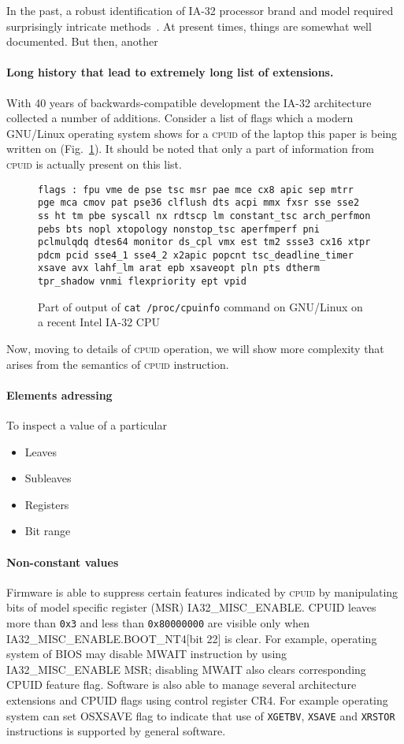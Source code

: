 \documentclass[a4paper,10pt,oneside,unicode]{article}
\newcommand{\cpuid}{\textsc{cpuid} }
\begin{document}
In the past, a robust identification of IA-32 processor brand and model required surprisingly intricate methods~\cite{cpuid-wars}. At present times, things are somewhat well documented. But then, another

\paragraph{Long history that lead to extremely long list of extensions.} With 40 years of backwards-compatible development the IA-32 architecture collected a number of additions. Consider a list of flags which a modern GNU/Linux operating system shows for a \cpuid of the laptop this paper is being written on (Fig.~\ref{fig:flags}). It should be noted that only a part of information from \cpuid is actually present on this list.

\begin{figure}
\noindent\texttt{flags           : fpu vme de pse tsc msr pae mce cx8 apic sep mtrr pge mca cmov pat pse36 clflush dts acpi mmx fxsr sse sse2 ss ht tm pbe syscall nx rdtscp lm constant\_tsc arch\_perfmon pebs bts nopl xtopology nonstop\_tsc aperfmperf pni pclmulqdq dtes64 monitor ds\_cpl vmx est tm2 ssse3 cx16 xtpr pdcm pcid sse4\_1 sse4\_2 x2apic popcnt tsc\_deadline\_timer xsave avx lahf\_lm arat epb xsaveopt pln pts dtherm tpr\_shadow vnmi flexpriority ept vpid
}
\caption{Part of output of \texttt{cat /proc/cpuinfo} command on GNU/Linux on a recent Intel IA-32 {CPU}}\label{fig:flags}
\end{figure} 

Now, moving to details of \cpuid operation, we will show more complexity that arises from the semantics of \cpuid instruction.

\paragraph{Elements adressing}

To inspect a value of a particular
\begin{itemize}
\item Leaves
\item Subleaves
\item Registers
\item Bit range
\end{itemize}

\paragraph{Non-constant values} Firmware is able to suppress certain features indicated by \cpuid by manipulating bits of model specific register (MSR) IA32\_MISC\_ENABLE. CPUID leaves more than \texttt{0x3} and less than \texttt{0x80000000} are visible only when IA32\_MISC\_ENABLE.BOOT\_NT4[bit 22] is clear. For example, operating system of BIOS may disable MWAIT instruction by using IA32\_MISC\_ENABLE MSR; disabling MWAIT also clears corresponding CPUID feature flag. Software is also able to manage several architecture extensions and CPUID flags using control register CR4. For example operating system can set OSXSAVE flag to indicate that use of \texttt{XGETBV}, \texttt{XSAVE} and \texttt{XRSTOR} instructions is supported by general software.
\end{document}
